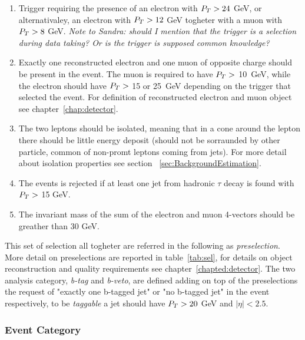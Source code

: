 \begin{enumerate}[label=(\roman*)]
\item Trigger requiring the presence of an electron with $P_{T} > 24$ GeV, or alternativaley,
	an electron with  $P_{T} > 12$ GeV togheter with a muon with  $P_{T} > 8$ GeV. 
	{\em \footnotesize  Note to Sandra: should I mention that the trigger is a selection during data taking?
	Or is the trigger is supposed common knowledge?}

\item Exactly one reconstructed electron and one muon of opposite charge should be present in the event. The muon is required to have $P_{T} > $ 10~GeV, while the electron 
should have $P_{T} > $ 15 or 25~GeV depending on the trigger that selected the event. For definition of reconstructed electron and muon object 
see chapter~\ref{chap:detector}.

\item The two leptons should be isolated, meaning that in a cone around the lepton there should be little energy deposit (should not be sorraunded by                 
other particle, common of non-promt leptons coming from jets). For more detail about isolation properties see section ~\ref{sec:BackgroundEstimation}.

\item The events is rejected if at least one jet from hadronic $\tau$ decay is found with $P_{T} > $ 15 GeV.

\item The invariant mass of the sum of the electron and muon 4-vectors should be greather than 30 GeV.
\end{enumerate}
This set of selection all togheter are referred in the following as \emph{preselection}. More detail on preselections 
are reported in table~\ref{tab:sel}, for details on object reconstruction and quality requirements see chapter~\ref{chapted:detector}. 
The two analysis category, \emph{b-tag} and \emph{b-veto}, are defined adding on top of the preselections 
the request of "exactly one b-tagged jet" or "no b-tagged jet" in the event respectively, to be 
\emph{taggable} a jet should have $P_{T} > 20$ GeV and $|\eta| < 2.5$.


\subsubsection{Event Category}\label{sec:selectiona}

